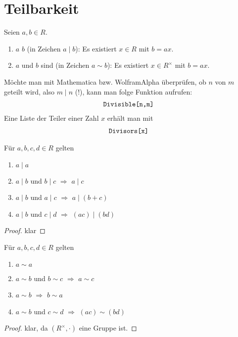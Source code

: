 \section{Teilbarkeit}

\begin{definition}[Teilbarkeit]
	Seien $a,b\in R$.
	\begin{enumerate}
		\item $a$  $b$ (in Zeichen $a\mid b$): Es existiert $x\in R$ mit $b=ax$.
		\item $a$ und $b$ sind  (in Zeichen $a\sim b$): Es existiert $x\in R^{\times}$ mit $b=ax$.
	\end{enumerate}
\end{definition}

\begin{mathematica}[Teiler]
	Möchte man mit Mathematica bzw. WolframAlpha überprüfen, ob $n$ von $m$ geteilt wird, also $m\mid n$ (!), kann man folge Funktion aufrufen:
	\begin{align}
		\texttt{Divisible[n,m]}\notag
	\end{align}
	Eine Liste der  Teiler einer Zahl $x$ erhält man mit
	\begin{align}
		\texttt{Divisors[x]}\notag
	\end{align}
\end{mathematica}

\begin{lemma}
	Für $a,b,c,d\in R$ gelten
	\begin{enumerate}
		\item $a\mid a$
		\item $a\mid b$ und $b\mid c$ $\Rightarrow$ $a\mid c$
		\item $a\mid b$ und $a\mid c$ $\Rightarrow$ $a\mid (b+c)$
		\item $a\mid b$ und $c\mid d$ $\Rightarrow$ $(ac)\mid (bd)$
	\end{enumerate}
\end{lemma}
\begin{proof}
	klar
\end{proof}

\begin{lemma}
	Für $a,b,c,d\in R$ gelten
	\begin{enumerate}
		\item $a\sim a$
		\item $a\sim b$ und $b\sim c$ $\Rightarrow$ $a\sim c$
		\item $a\sim b$ $\Rightarrow$ $b\sim a$
		\item $a\sim b$ und $c\sim d$ $\Rightarrow$ $(ac)\sim (bd)$
	\end{enumerate}
\end{lemma}
\begin{proof}
	klar, da $(R^\times,\cdot)$ eine Gruppe ist.
\end{proof}

